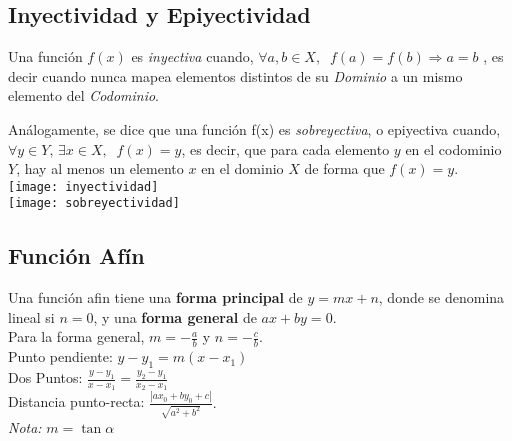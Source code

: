 \subsection{Inyectividad y Epiyectividad}
Una función $f(x)$ es \textit{inyectiva} cuando,
$\forall a,b \in X, \;\; f(a)=f(b) \Rightarrow a=b$
, es decir cuando nunca mapea elementos distintos de su \textit{Dominio} a un mismo elemento del \textit{Codominio}.

Análogamente, se dice que una función f(x) es \textit{sobreyectiva}, o epiyectiva cuando, $\forall y \in Y, \, \exists x \in X, \;\; f(x)=y$, es decir, que para cada elemento $y$ en el codominio $Y$, hay al menos un elemento $x$ en el dominio $X$ de forma que $f(x) = y$.\\
\texttt{[image: inyectividad]}\\
\texttt{[image: sobreyectividad]}
\subsection{Función Afín}
Una función afin tiene una \textbf{forma principal} de $y = mx + n$, donde se denomina lineal si $n=0$, y una \textbf{forma general} de $ax + by = 0$.\\
Para la forma general, $m = -\frac{a}{b}$ y $n = -\frac{c}{b}.$\\
Punto pendiente: $y - y_1 = m(x - x_1)$\\
Dos Puntos: $\frac{y-y_1}{x-x_1} = \frac{y_2-y_1}{x_2-x_1}$\\
Distancia punto-recta: $\frac{|ax_0+by_0+c|}{\sqrt{a^2+b^2}}.$\\
\textit{Nota:} $m = \tan \alpha$